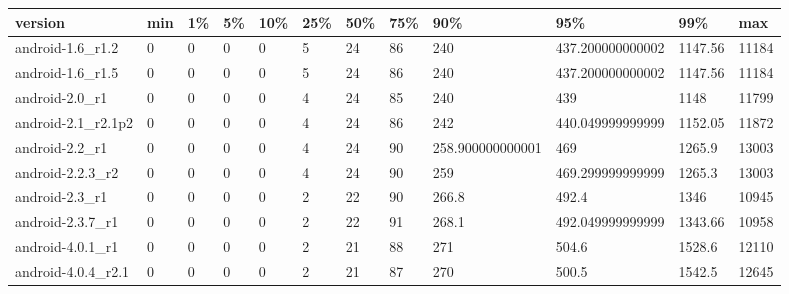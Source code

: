 \documentclass[a4paper]{article}
\begin{document}
\begin{tabular}{|l|l|l|l|l|l|l|l|l|l|l|l|}
\hline
version&min&1\%&5\%&10\%&25\%&50\%&75\%&90\%&95\%&99\%&max\\
\hline
android-1.6\_r1.2&0&0&0&0&5&24&86&240&437.200000000002&1147.56&11184\\
\hline
android-1.6\_r1.5&0&0&0&0&5&24&86&240&437.200000000002&1147.56&11184\\
\hline
android-2.0\_r1&0&0&0&0&4&24&85&240&439&1148&11799\\
\hline
android-2.1\_r2.1p2&0&0&0&0&4&24&86&242&440.049999999999&1152.05&11872\\
\hline
android-2.2\_r1&0&0&0&0&4&24&90&258.900000000001&469&1265.9&13003\\
\hline
android-2.2.3\_r2&0&0&0&0&4&24&90&259&469.299999999999&1265.3&13003\\
\hline
android-2.3\_r1&0&0&0&0&2&22&90&266.8&492.4&1346&10945\\
\hline
android-2.3.7\_r1&0&0&0&0&2&22&91&268.1&492.049999999999&1343.66&10958\\
\hline
android-4.0.1\_r1&0&0&0&0&2&21&88&271&504.6&1528.6&12110\\
\hline
android-4.0.4\_r2.1&0&0&0&0&2&21&87&270&500.5&1542.5&12645\\
\hline
\end{tabular}
\end{document}

